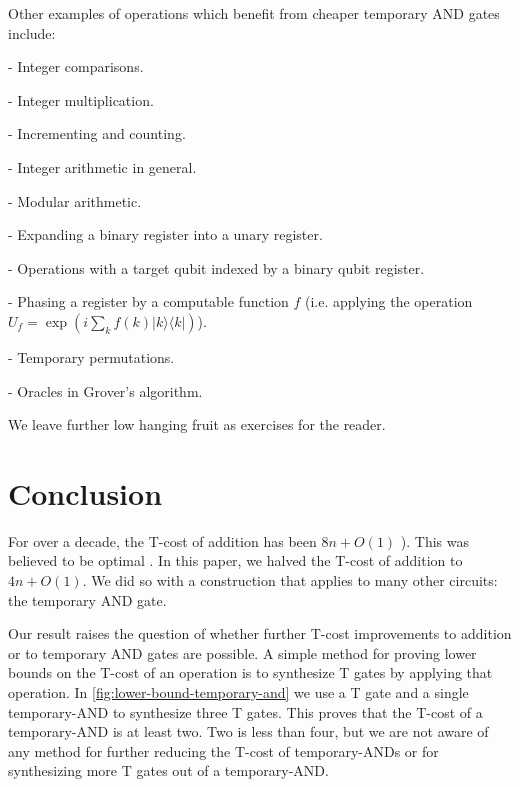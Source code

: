 \documentclass[twocolumn,longbibliography]{quantumarticle-customized}
\begin{document}
Other examples of operations which benefit from cheaper temporary AND gates include:

- Integer comparisons.

- Integer multiplication.

- Incrementing and counting.

- Integer arithmetic in general.

- Modular arithmetic.

- Expanding a binary register into a unary register.

- Operations with a target qubit indexed by a binary qubit register.

- Phasing a register by a computable function $f$ (i.e. applying the operation $U_f = \exp\left( i \sum_k f(k) |k\rangle \langle k| \right)$).

- Temporary permutations.

- Oracles in Grover's algorithm.

We leave further low hanging fruit as exercises for the reader.


\section{Conclusion}
\label{sec:conclusion}

For over a decade, the T-cost of addition has been $8n + O(1)$ \cite{Barenco1995, Cuccaro2004, Amy2013}).
This was believed to be optimal \cite{AustinDiscussionsAndEmails2017}.
In this paper, we halved the T-cost of addition to $4n + O(1)$.
We did so with a construction that applies to many other circuits: the temporary AND gate.

Our result raises the question of whether further T-cost improvements to addition or to temporary AND gates are possible.
A simple method for proving lower bounds on the T-cost of an operation is to synthesize T gates by applying that operation.
In \autoref{fig:lower-bound-temporary-and} we use a T gate and a single temporary-AND to synthesize three T gates.
This proves that the T-cost of a temporary-AND is at least two.
Two is less than four, but we are not aware of any method for further reducing the T-cost of temporary-ANDs or for synthesizing more T gates out of a temporary-AND.
\end{document}
